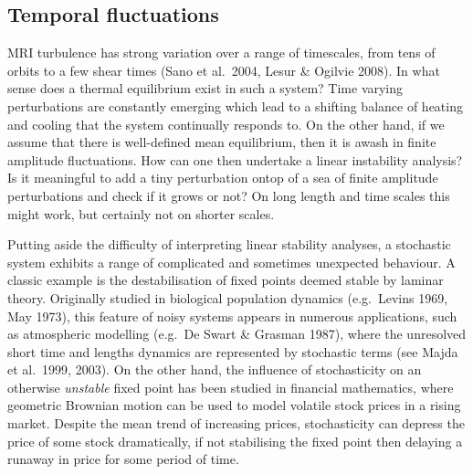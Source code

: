 \documentclass[useAMS]{mn2e}
\begin{document}
\subsection{Temporal  fluctuations}

MRI turbulence has strong variation over a range of timescales, from
tens of orbits 
to a few
shear times (Sano
et al.~2004, Lesur \& Ogilvie 2008). In what sense does a thermal equilibrium exist in such a
system? Time varying perturbations are constantly emerging which
lead to a shifting balance of heating and cooling
that the system continually responds
to. On the other hand, if we assume that there is well-defined mean
equilibrium, 
then it is
awash in finite amplitude fluctuations. How can one then undertake a linear
instability analysis? Is it meaningful to add a tiny perturbation
ontop of a sea of 
finite amplitude perturbations and check if it grows or not? 
On long length and time scales this might work, but
certainly not on shorter scales.

Putting aside the difficulty of interpreting linear stability
analyses, a stochastic system exhibits a range of complicated and
sometimes
unexpected behaviour. A classic example is the destabilisation of
fixed points deemed stable by laminar theory. Originally studied in
biological population dynamics (e.g.\ Levins 1969, May 1973), this
feature of noisy systems appears in numerous
applications, such as atmospheric modelling (e.g.\ De Swart \& Grasman
1987), where the unresolved short time and lengths dynamics are
represented by stochastic terms (see Majda et al.\ 1999, 2003).
On the other hand, 
the influence of stochasticity on an otherwise \emph{unstable} fixed point
has been studied in financial mathematics, where geometric Brownian motion can
be used to model volatile stock prices in a rising market. Despite the
mean trend of increasing prices, stochasticity can depress the price
of some stock dramatically, if not stabilising the fixed point then
delaying a runaway in price for some period of time.
\end{document}
